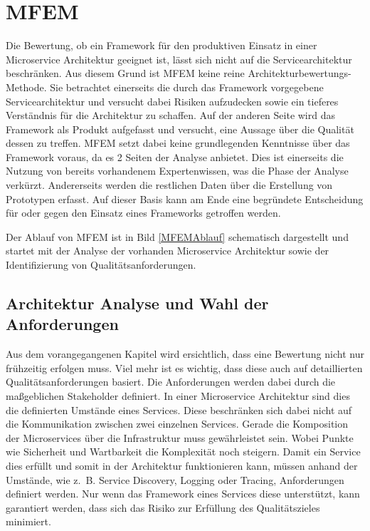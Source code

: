 \section{\acf{MFEM}}

Die Bewertung, ob ein Framework für den produktiven Einsatz in einer Microservice Architektur geeignet ist, lässt sich nicht auf die Servicearchitektur beschränken. Aus diesem Grund ist \ac{MFEM} keine reine Architekturbewertungs-Methode. Sie betrachtet einerseits die durch das Framework vorgegebene Servicearchitektur und versucht dabei Risiken aufzudecken sowie ein tieferes Verständnis für die Architektur zu schaffen. Auf der anderen Seite wird das Framework als Produkt aufgefasst und versucht, eine Aussage über die Qualität dessen zu treffen. \ac{MFEM} setzt dabei keine grundlegenden Kenntnisse über das Framework voraus, da es 2 Seiten der Analyse anbietet. Dies ist einerseits die Nutzung von bereits vorhandenem Expertenwissen, was die Phase der Analyse verkürzt. Andererseits werden die restlichen Daten über die Erstellung von Prototypen erfasst.
Auf dieser Basis kann am Ende eine begründete Entscheidung für oder gegen den Einsatz eines Frameworks getroffen werden.

Der Ablauf von \ac{MFEM} ist in Bild \ref{MFEMAblauf} schematisch dargestellt und startet mit der Analyse der vorhanden Microservice Architektur sowie der Identifizierung von Qualitätsanforderungen.


\subsection{Architektur Analyse und Wahl der Anforderungen}

Aus dem vorangegangenen Kapitel wird ersichtlich, dass eine Bewertung nicht nur frühzeitig erfolgen muss. Viel mehr ist es wichtig, dass diese auch auf detaillierten Qualitätsanforderungen basiert. Die Anforderungen werden dabei durch die maßgeblichen Stakeholder definiert. In einer Microservice Architektur sind dies die definierten Umstände eines Services. Diese beschränken sich dabei nicht auf die Kommunikation zwischen zwei einzelnen Services. Gerade die Komposition der Microservices über die Infrastruktur muss gewährleistet sein. Wobei Punkte wie Sicherheit und Wartbarkeit die Komplexität noch steigern.
Damit ein Service dies erfüllt und somit in der Architektur funktionieren kann, müssen anhand der Umstände, wie z.~B. Service Discovery, Logging oder Tracing, Anforderungen definiert werden. Nur wenn das Framework eines Services diese unterstützt, kann garantiert werden, dass sich das Risiko zur Erfüllung des Qualitätszieles minimiert.

